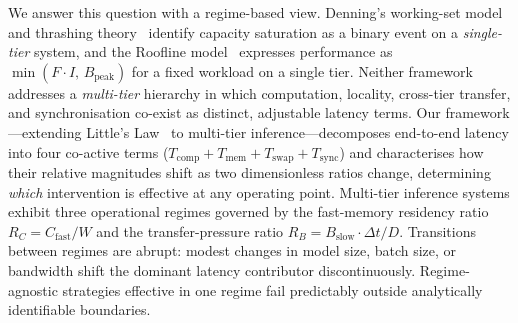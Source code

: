 We answer this question with a regime-based view.
Denning's working-set model and thrashing theory~\cite{mattson1970evaluation}
identify capacity saturation as a binary event on a \emph{single-tier} system,
and the Roofline model~\cite{williams2009roofline} expresses performance as
$\min(F \cdot I,\, B_{\mathrm{peak}})$ for a fixed workload on a single tier.
Neither framework addresses a \emph{multi-tier} hierarchy in which computation,
locality, cross-tier transfer, and synchronisation co-exist as distinct,
adjustable latency terms.
Our framework---extending Little's Law~\cite{kleinrock1975queueing} to multi-tier
inference---decomposes end-to-end latency into four co-active terms
($T_{\mathrm{comp}} + T_{\mathrm{mem}} + T_{\mathrm{swap}} + T_{\mathrm{sync}}$)
and characterises how their relative magnitudes shift as two dimensionless
ratios change, determining \emph{which} intervention is effective at any
operating point.
Multi-tier inference systems exhibit three operational regimes governed by the
fast-memory residency ratio $R_C = C_{\mathrm{fast}}/W$ and the
transfer-pressure ratio $R_B = B_{\mathrm{slow}} \cdot \Delta t / D$.
Transitions between regimes are abrupt: modest changes in model size, batch
size, or bandwidth shift the dominant latency contributor discontinuously.
Regime-agnostic strategies effective in one regime fail predictably outside
analytically identifiable boundaries.


